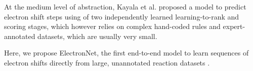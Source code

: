 At the medium level of abstraction, Kayala et al. proposed a model to predict electron shift steps using of two independently learned learning-to-rank and scoring stages,
 which however relies on complex hand-coded rules and expert-annotated datasets, which are usually very small.\cite{kayala2011learning,kayala2012reactionpredictor} 


Here, we propose ElectronNet, the first end-to-end model to learn sequences of electron shifts directly from large, unannotated reaction datasets .